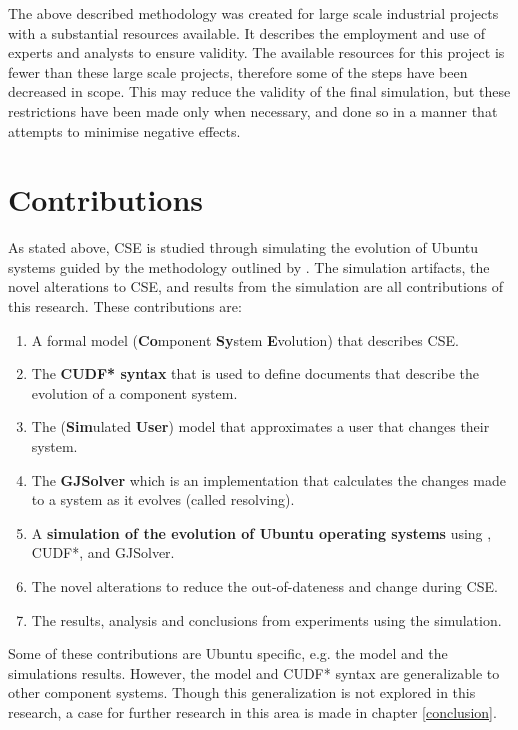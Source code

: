 The above described methodology was created for large scale industrial projects with a substantial resources available.
It describes the employment and use of experts and analysts to ensure validity.
The available resources for this project is fewer than these large scale projects, therefore some of the steps have been decreased in scope.
This may reduce the validity of the final simulation, but these restrictions have been made only when necessary,
and done so in a manner that attempts to minimise negative effects.

\section{Contributions}
As stated above, CSE is studied through simulating the evolution of Ubuntu systems guided by the methodology outlined by \cite{Law2005}.
The simulation artifacts, the novel alterations to CSE, and results from the simulation are all contributions of this research. 
These contributions are:
\begin{enumerate}
  \item A formal model \textbf{\modelname} (\textbf{Co}mponent \textbf{Sy}stem \textbf{E}volution) that describes CSE. 
  \item The \textbf{CUDF* syntax} that is used to define documents that describe the evolution of a component system.
  \item The \textbf{\usermodel} (\textbf{Sim}ulated \textbf{User}) model that approximates a user that changes their system.
  \item The \textbf{GJSolver} which is an implementation that calculates the changes made to a system as it evolves (called resolving).
  \item A \textbf{simulation of the evolution of Ubuntu operating systems} using \modelname, CUDF*, \usermodel and GJSolver.
  \item The novel alterations to reduce the out-of-dateness and change during CSE. 
  \item The results, analysis and conclusions from experiments using the simulation.
\end{enumerate}

Some of these contributions are Ubuntu specific, e.g. the \usermodel model and the simulations results.
However, the \modelname model and CUDF* syntax are generalizable to other component systems.
Though this generalization is not explored in this research, a case for further research in this area is made in chapter \ref{conclusion}.

